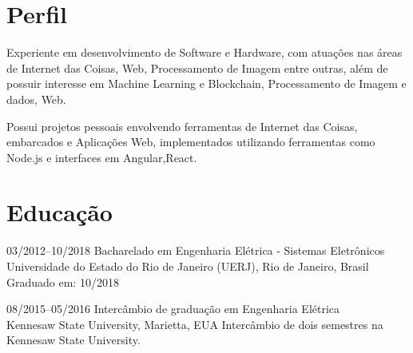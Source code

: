 \documentclass[]{friggeri-cv} %
\begin{document}
\section{Perfil}

Experiente em desenvolvimento de Software e Hardware, com atuações nas áreas de Internet das Coisas, Web, Processamento de Imagem entre outras, além de possuir interesse em Machine Learning e Blockchain, Processamento de Imagem e dados, Web.

Possui projetos pessoais envolvendo ferramentas de Internet das Coisas, embarcados e Aplicações Web, implementados utilizando ferramentas  como Node.js e interfaces em Angular,React.


\section{Educação}

\begin{entrylist}


\entry
{03/2012--10/2018}
{\hspace{.25cm} Bacharelado em Engenharia Elétrica - Sistemas Eletrônicos}
{\\Universidade do Estado do Rio de Janeiro (UERJ), Rio de Janeiro, Brasil}
{Graduado em: 10/2018 \\ \color{red}{CR = 7.85/10.0} }


\entry
{08/2015--05/2016}
{\hspace{.25cm} Intercâmbio de graduação em Engenharia Elétrica}
{\\Kennesaw State University, Marietta, EUA}
{Intercâmbio de dois semestres na Kennesaw State University.  \\
\color{red}{GPA = 3.9/4.0} }


\end{entrylist}

\end{document}
